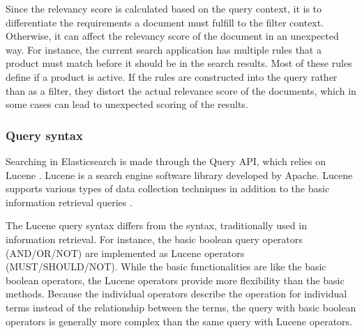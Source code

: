 Since the relevancy score is calculated based on the query context, it is to differentiate
the requirements a document must fulfill to the filter context.
Otherwise, it can affect the relevancy score of the document in an unexpected way.
For instance, the current search application has multiple rules that a product must match 
before it should be in the search results. 
Most of these rules define if a product is active.
If the rules are constructed into the query rather than as a filter, they
distort the actual relevance score of the documents, 
which in some cases can lead to unexpected scoring of the results.





\subsubsection{Query syntax}

Searching in Elasticsearch is made through the Query API, which relies on Lucene \cite{elasticIntro}.
Lucene is a search engine software library developed by Apache.
Lucene supports various types of data collection techniques in addition to 
the basic information retrieval queries \cite{relevantSearch}.

The Lucene query syntax differs from the syntax, traditionally used in information retrieval.
For instance, the basic boolean query operators (AND/OR/NOT) are implemented as Lucene operators (MUST/SHOULD/NOT).
While the basic functionalities are like the basic boolean operators, 
the Lucene operators provide more flexibility than the basic methods.
Because the individual operators describe the operation for individual terms instead of the relationship between the terms,
the query with basic boolean operators is generally more complex than the same query with Lucene operators.
\cite{relevantSearch}

